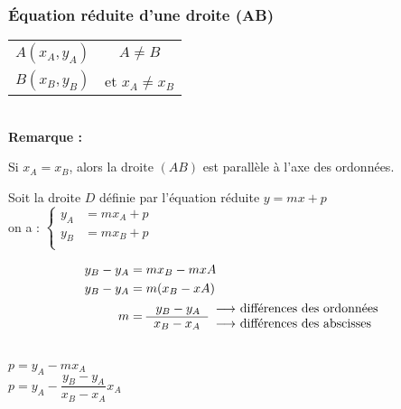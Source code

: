 \newpage

\subsubsection{Équation réduite d'une droite (AB)}

\begin{tabular}{lc}
$A(x_A, y_A)$ & $A\neq B$ \\
$B(x_B, y_B)$ & et $x_A \neq x_B$\\
\end{tabular}\\

\textbf{Remarque :}

Si $x_A = x_B $, alors la droite $(AB)$ est parallèle à l'axe des ordonnées.

Soit la droite $D$ définie par l'équation réduite $y=mx+p$\\

on a : $\begin{cases}
y_A\!\!\!\!\!\!\!\!&= mx_A + p\\
y_B\!\!\!\!\!\!\!\!&= mx_B +p\\
      \end{cases}$\\
      
\begin{minipage}{6cm}      
  \begin{equation*} 
    \begin{aligned}
      y_B-y_A &= mx_B-mxA\\
      y_B-y_A &= m(x_B-xA)\\
            m &= \begin{tabular}{rl}
                    $y_B-y_A$ & $\longrightarrow$ différences des ordonnées \\
                    \cline{1-1}
                    $x_B-x_A$ & $\longrightarrow$ différences des abscisses \\
                 \end{tabular} \\                     
    \end{aligned} 
 \end{equation*}
\end{minipage}\\

$p=y_A - mx_A$\\

$p=y_A - \dfrac{y_B-y_A}{x_B-x_A} x_A$\\

